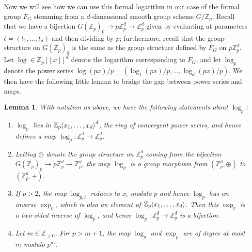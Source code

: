 \documentclass[12pt]{article}
\newcommand{\Z}{\mathbb{Z}}
\renewcommand{\angle}[1]{\hspace{-2pt}\left\langle #1 \right\rangle}
\theoremstyle{plain}
\newtheorem{lem}[thm]{Lemma} %
\theoremstyle{definition}
\theoremstyle{remark}
\begin{document}
Now we will see how we can use this formal logarithm in our case of the formal group $F_G$ stemming from a $d$-dimensional smooth group scheme $G/\Z_p$. Recall that we have a bijection $G(\Z_p)_0 \to p\Z_p^d \to \Z_p^d$ given by evaluating at parameters $t = (t_1,\dots,t_d)$ and then dividing by $p$; furthermore, recall that the group structure on $G(\Z_p)_0$ is the same as the group structure defined by $F_G$ on $p\Z_p^d$. Let $\log \in \Z_p[[x]]^d$ denote the logarithm corresponding to $F_G$, and let $\log_p$ denote the power series $\log(px)/p = (\log_1(px)/p,\dots,\log_d(px)/p)$. We then have the following little lemma to bridge the gap between power series and maps.
\begin{lem}
\label{lem:formallog}
With notation as above, we have the following statements about $\log_p$:
\begin{enumerate}
	\item $\log_p$ lies in $\Z_p\angle{x_1,\dots,x_d}^d$, the ring of convergent power series, and hence defines a map $\log_p: \Z_p^d \to \Z_p^d$.
	\item Letting $\oplus$ denote the group structure on $\Z_p^d$ coming from the bijection $G(\Z_p)_0 \to p\Z_p^d \to \Z_p^d$, the map $\log_p$ is a group morphism from $(\Z_p^d,\oplus)$ to $(\Z_p^d,+)$.
	\item If $p > 2$, the map $\log_{p,i}$ reduces to $x_i$ modulo $p$ and hence $\log_p$ has an inverse $\exp_p$, which is also an element of $\Z_p\angle{x_1,\dots,x_d}$. Then this $\exp_p$ is a two-sided inverse of $\log_p$, and hence $\log_p: \Z_p^d \to \Z_p^d$ is a bijection.
	\item Let $m \in \Z_{>0}$. For $p > m+1$, the map $\log_p$ and $\exp_p$ are of degree at most $m$ modulo $p^m$.
\end{enumerate} 
\end{lem}
\end{document}

